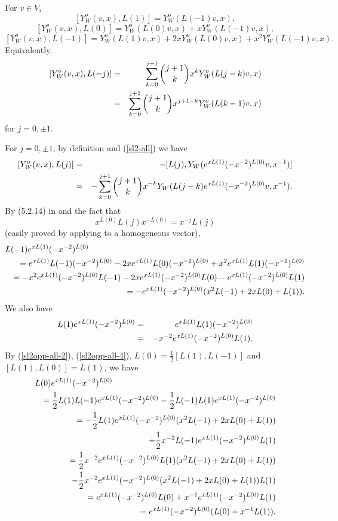 \documentclass[12pt]{article}
\begin{document}
\begin{lemma}\label{sl2opposite}
For $v \in V$,
\begin{equation}\label{sl2opp-1}
[Y^o_W(v,x),L(1)]=Y^o_W(L(-1)v,x),
\end{equation}
\begin{equation}\label{sl2opp-2}
[Y^o_W(v,x),L(0)]=Y^o_W(L(0)v,x)+xY^o_W(L(-1)v,x),
\end{equation}
\begin{equation}\label{sl2opp-3}
[Y^o_W(v,x),L(-1)]=Y^o_W(L(1)v,x)+2xY^o_W(L(0)v,x)+x^2Y^o_W(L(-1)v,x).
\end{equation}
Equivalently,
\begin{eqnarray}\label{sl2opp-all}
[Y^o_W(v,x),L(-j)]&=&\sum_{k=0}^{j+1}{j+1\choose k}x^k
Y^o_W(L(j-k)v,x)\nonumber\\
&=&\sum_{k=0}^{j+1}{j+1\choose k}x^{j+1-k}
Y^o_W(L(k-1)v,x)
\end{eqnarray}
for $j=0,\pm 1$.
\end{lemma}
\pf
For $j=0, \pm 1$, by definition and (\ref{sl2-all}) we have
\begin{eqnarray}\label{sl2opp-all-1}
[Y^o_W(v,x),L(j)]&=&-[L(j), Y_W(e^{xL(1)}(-x^{-2})^{L(0)}v,x^{-1})]\nonumber\\
&=&-\sum_{k=0}^{j+1}{j+1\choose k}x^{-k}Y_{W}(L(j-k)
e^{xL(1)}(-x^{-2})^{L(0)}v,x^{-1}).
\end{eqnarray}
By (5.2.14) in \cite{FHL} and the fact that
\begin{equation}\label{xL(0)L(j)}
x^{L(0)}L(j)x^{-L(0)}=x^{-j}L(j)
\end{equation}
(easily proved by applying to a homogeneous vector),
\begin{eqnarray}\label{sl2opp-all-2}
\lefteqn{L(-1)e^{xL(1)}(-x^{-2})^{L(0)}}\nn
&&=
e^{xL(1)}L(-1)(-x^{-2})^{L(0)}-2xe^{xL(1)}L(0)(-x^{-2})^{L(0)}
+x^{2}e^{xL(1)}L(1)(-x^{-2})^{L(0)}\nn
&&=-x^{2}e^{xL(1)}(-x^{-2})^{L(0)}L(-1)-2xe^{xL(1)}(-x^{-2})^{L(0)}L(0)
-e^{xL(1)}(-x^{-2})^{L(0)}L(1)\nn
&&=-e^{xL(1)}(-x^{-2})^{L(0)}(x^{2}L(-1)+2xL(0)+L(1)).
\end{eqnarray}
We also have
\begin{eqnarray}\label{sl2opp-all-4}
L(1)e^{xL(1)}(-x^{-2})^{L(0)}&=&
e^{xL(1)}L(1)(-x^{-2})^{L(0)}\nonumber\\
&=&-x^{-2}e^{xL(1)}(-x^{-2})^{L(0)}L(1).
\end{eqnarray}
By (\ref{sl2opp-all-2}), (\ref{sl2opp-all-4}),
$L(0)=\frac{1}{2}[L(1), L(-1)]$ and $[L(1), L(0)]=L(1)$, we have
\begin{eqnarray}\label{sl2opp-all-3}
\lefteqn{L(0)e^{xL(1)}(-x^{-2})^{L(0)}}\nn
&&=\frac{1}{2}L(1)L(-1)e^{xL(1)}(-x^{-2})^{L(0)}
-\frac{1}{2}L(-1)L(1)e^{xL(1)}(-x^{-2})^{L(0)}\nn
&&=-\frac{1}{2}L(1)e^{xL(1)}(-x^{-2})^{L(0)}(x^{2}L(-1)+2xL(0)+L(1))\nn
&&\quad +\frac{1}{2}x^{-2}L(-1)e^{xL(1)}(-x^{-2})^{L(0)}L(1)\nn
&&=\frac{1}{2}x^{-2}e^{xL(1)}(-x^{-2})^{L(0)}L(1)(x^{2}L(-1)+2xL(0)+L(1))\nn
&&\quad
-\frac{1}{2}x^{-2}e^{xL(1)}(-x^{-2})^{L(0)}(x^{2}L(-1)+2xL(0)+L(1))L(1)\nn
&&=e^{xL(1)}(-x^{-2})^{L(0)}L(0)+x^{-1}e^{xL(1)}(-x^{-2})^{L(0)}L(1)\nn
&&=e^{xL(1)}(-x^{-2})^{L(0)}(L(0)+x^{-1}L(1)).
\end{eqnarray}
\end{document}
